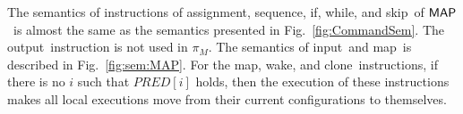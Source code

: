 \documentclass[10pt,a4paper,oneside]{article}
\def\constructV#1#2{\ensuremath{\ouvd[#2\mapsto#1]}}
\def\substitute#1#2#3{\ensuremath{#1[#2\mapsto#3]}}
\def\fork#1#2{\ensuremath{fork(#1,#2)}}
\def\signal{\ensuremath{signal}}
\def\ProgM{\ensuremath{\Prog_{M}}}
\def\sE{\textbf{E}}
\def\sS{\textbf{S}}
\def\ST{{\ensuremath{EX}}}
\def\TOP{\ensuremath{TOP}}
\def\ouvd{\ensuremath{\vec{\bot}}}
\def\chnl{\ensuremath{c}}
\def\NIL{\ensuremath{\bot}}
\def\ACCORCIA{\vspace*{-\baselineskip}}
\def\lcomma{\ensuremath{\!\!:\!\!}}
\def\sanserif#1{\ensuremath{\sf #1}}
\def\MAP{\ensuremath{\sanserif{MAP}}}
\def\Prog{\ensuremath{\pi}}
\def\comm{\ensuremath{\pi}}
\def\commM{\ensuremath{\comm_M}}
\def\Iid{\ensuremath{I}}
\def\LabelRule#1#2#3{\ensuremath{{\inferrule*[Left={#1}]{#2}{#3}}}}
\def\RINPM{INPM}
\def\RMAP{MAP}
\def\RCLONE{CLON}
\def\RWAKE{WAKM}
\def\NASSG{assignment}
\def\NCOMP{sequence}
\def\NIF{if}
\def\NWHILE{while}
\def\NSKIP{skip}
\def\NINPUT{input}
\def\NOUTPUT{output}
\def\NMAP{map}
\def\NCLONE{clone}
\def\NWAKE{wake}
\def\iclone#1#2#3{\ensuremath{\textbf{\NCLONE}(#1,#2,#3)}}
\def\NPRED{\ensuremath{PRED}}
\def\emptyPlace{\ensuremath{[\ ]}}
\def\PREDD{\ensuremath{\NPRED\emptyPlace}}
\def\PREDE#1{\ensuremath{\NPRED[#1]}}
\def\indexOf#1{\ensuremath{assignIndex(#1)}}
\def\lprogm{{\sf prg}}
\def\lmemm{{\sf \ensuremath{mem}}}
\def\linput{{\sf in}}
\def\LECS{{\sf \ensuremath{LECS}}}
\def\LECSI{\ensuremath{\LECS_{i}}}
\def\litr{{\sf int}}
\def\lmap{{\sf map}}
\def\lstate{{\sf stt}}
\def\tcolm{\ensuremath{PRIV_{T_M}}}
\def\tcolr{\ensuremath{PRIV_{T_R}}}
\begin{document}
The semantics of instructions of \NASSG, \NCOMP, \NIF, \NWHILE, and \NSKIP\ of \MAP\ is almost the same as the semantics presented in Fig.~\ref{fig:CommandSem}. The \NOUTPUT\ instruction is not used in \ProgM. The semantics of \NINPUT\ and \NMAP\ is described in Fig.~\ref{fig:sem:MAP}. For the \NMAP, \NWAKE, and \NCLONE\ instructions, if there is no $i$ such that \PREDE{i} holds, then the execution of these instructions makes all local executions move from their current configurations to themselves.

\begin{figure}[!t]
\begin{center}
\ACCORCIA
{}
\end{center}
\end{figure}
\end{document}

